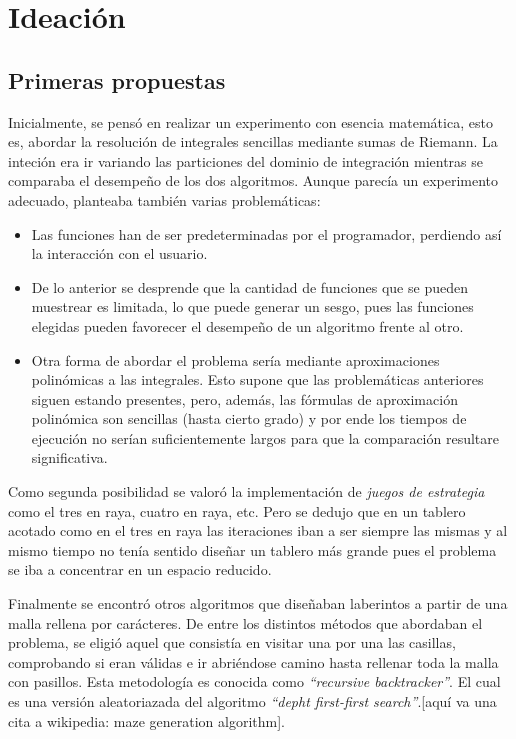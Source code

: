\documentclass[12pt,a4paper]{article}
\begin{document}
\section{Ideación}
\subsection{Primeras propuestas}

Inicialmente, se pensó en realizar un experimento con esencia matemática, esto es, abordar la resolución de integrales sencillas mediante sumas de Riemann. La inteción era ir variando las particiones del dominio de integración mientras se comparaba el desempeño de los dos algoritmos. Aunque parecía un experimento adecuado, planteaba también varias problemáticas: 

\begin{itemize}
	\item Las funciones han de ser predeterminadas por el programador, perdiendo así la interacción con el usuario.
	\item De lo anterior se desprende que la cantidad de funciones que se pueden muestrear es limitada, lo que puede generar un sesgo, pues las funciones elegidas pueden favorecer el desempeño de un algoritmo frente al otro. 
	\item Otra forma de abordar el problema sería mediante aproximaciones polinómicas a las integrales. Esto supone que las problemáticas anteriores siguen estando presentes, pero, además, las fórmulas de aproximación polinómica son sencillas (hasta cierto grado) y por ende los tiempos de ejecución no serían suficientemente largos para que la comparación resultare significativa. 
\end{itemize}

Como segunda posibilidad se valoró la implementación de \textit{juegos de estrategia} como el tres en raya, cuatro en raya, etc. Pero se dedujo que en un tablero acotado como en el tres en raya las iteraciones iban a ser siempre las mismas y al mismo tiempo no tenía sentido diseñar un tablero más grande pues el problema se iba a concentrar en un espacio reducido.

Finalmente se encontró otros algoritmos que diseñaban laberintos a partir de una malla rellena por carácteres. De entre los distintos métodos que abordaban el problema, se eligió aquel que consistía en visitar una por una las casillas, comprobando si eran válidas e ir abriéndose camino hasta rellenar toda la malla con pasillos. Esta metodología es conocida como \textit{``recursive backtracker''}. El cual es una versión aleatoriazada del algoritmo \textit{``depht first-first search''}.[aquí va una cita a wikipedia: maze generation algorithm]. \\
\end{document}
